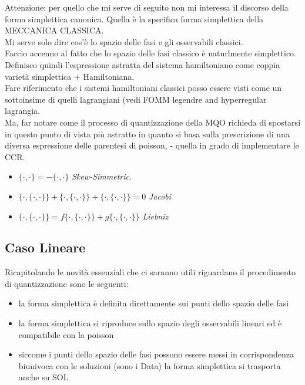 \documentclass[Main]{subfiles}
\begin{document}
	Attenzione: per quello che mi serve di seguito non mi interessa il discorso della forma simplettica canonica. Quella è la specifica forma simplettica della MECCANICA CLASSICA.\\
	Mi serve solo dire cos'è lo spazio delle fasi e gli osservabili classici.\\
	Faccio accenno al fatto che lo spazio delle fasi classico è naturlmente simplettico.\\
	Definisco quindi l'espressione astratta del sistema hamiltoniano come coppia varietà simplettica + Hamiltoniana.\\
	Fare riferimento che i sistemi hamiltoniani classici posso essere visti come un sottoinsime di quelli lagrangiani (vedi FOMM legendre and hyperregular lagrangia.\\
	Ma, far notare come il processo di quantizzazione della MQO richieda di spostarsi in questo punto di vista più astratto in quanto si basa sulla prescrizione di una diversa espressione delle parentesi di poisson, - quella in grado di implementare le CCR.\\
	
		\begin{proposition}
	
		\begin{itemize}
			\item $\{\cdot, \cdot\} = - \{\cdot, \cdot\}$ \emph{Skew-Simmetric}.
			\item $\{\cdot,\{\cdot, \cdot\}\} + \{\cdot,\{\cdot, \cdot\}\} + \{\cdot,\{\cdot, \cdot\}\} = 0$ \emph{Jacobi}
			\item $\{\cdot,\{\cdot, \cdot\}\}= f \{\cdot,\{\cdot, \cdot\}\} + g \{\cdot,\{\cdot, \cdot\}\}$ \emph{Liebniz}
\end{itemize}			
	
	\end{proposition}	
	
	\subsection{Caso Lineare}
		Ricapitolando le novità essenziali che ci saranno utili riguardano il procedimento di quantizzazione sono le seguenti:
		\begin{itemize}
			\item la forma simplettica è definita direttamente sui punti dello spazio delle fasi
			\item la forma simplettica si riproduce sullo spazio degli osservabili lineari ed è compatibile con la poisson
			\item siccome i punti dello spazio delle fasi possono essere messi in corrispondenza biunivoca con le soluzioni (sono i Data) la forma simplettica si trasporta anche su SOL
		\end{itemize}
	
\end{document}
